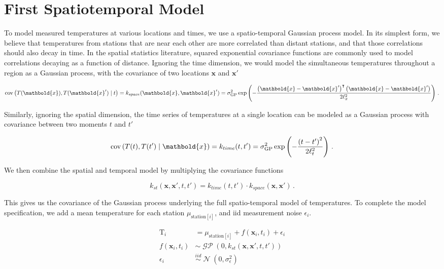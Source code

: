 \documentclass[letter]{article}
\newcommand{\genericdel}[3]{%
      \left#1#3\right#2
    }
\newcommand{\del}[1]{\genericdel(){#1}}
\newcommand{\sbr}[1]{\genericdel[]{#1}}
\DeclareMathOperator{\cov}{{cov}}
\DeclareMathOperator{\normal}{\mathcal{N}}
\DeclareMathOperator{\GP}{\mathcal{GP}}
\newcommand{\T}{\mathrm{T}}
\newcommand{\station}[1]{\mathrm{station}\sbr{#1}}
\newcommand{\xvec}{\mathbold{x}}
\newcommand{\iid}{iid}
\newcommand{\trans}{^{\intercal}}
\newcommand{\sigmaf}{\sigma_{\mathrm{GP}}}
\newcommand{\sigman}{\sigma_{\epsilon}}
\begin{document}
        \section{First Spatiotemporal Model}\label{first-spatiotemporal-model}

To model measured temperatures at various locations and times, we use a spatio-temporal Gaussian process model.
In its simplest form, we believe that temperatures from stations that are near each other are more correlated than distant stations, and that those correlations should also decay in time.
In the spatial statistics literature, squared exponential covariance functions are commonly used to model correlations decaying as a function of distance.
Ignoring the time dimension, we would model the simultaneous temperatures throughout a region as a Gaussian process, with the covariance of two locations \(\xvec\) and \(\xvec'\)

\begin{equation}
    \label{eq:kspace}
    \cov\del{T(\xvec), T(\xvec') \mid t} = k_{space}(\xvec, \xvec') = \sigmaf^2 \exp\del{-\frac{\del{\xvec-\xvec'}\trans\del{\xvec-\xvec'}}{2\ell_x^2}}\,.
\end{equation}

Similarly, ignoring the spatial dimension, the time series of temperatures at a single location can be modeled as a Gaussian process with covariance between two moments \(t\) and \(t'\)

\begin{equation}
\cov\del{T(t), T(t') \mid \xvec} = k_{time}(t, t') = \sigmaf^2 \exp\del{-\frac{\del{t-t'}^2}{2\ell_t^2}}\,.
\end{equation}

We then combine the spatial and temporal model by multiplying the covariance functions

\begin{equation}
k_{st}(\xvec,\xvec',t,t') = k_{time}(t,t') \cdot k_{space}(\xvec, \xvec')\,.
\end{equation}

This gives us the covariance of the Gaussian process underlying the full spatio-temporal model of temperatures.
To complete the model specification, we add a mean temperature for each station \(\mu_{\station{i}}\), and iid measurement noise \(\epsilon_i\).

\begin{align}
    \T_i &= \mu_{\station{i}} + f(\xvec_i, t_i) + \epsilon_i\\
    f(\xvec_i, t_i) &\sim \GP\del{0, k_{st}(\xvec,\xvec',t,t')}\\
    \epsilon_i &\overset{\iid}{\sim} \normal\del{0,\sigman^2}\\
\end{align}
    
\end{document}
